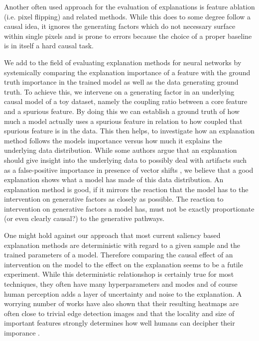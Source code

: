 Another often used approach for the evaluation of explanations is feature ablation (i.e. pixel flipping) and related methods. While this does to some degree follow a causal idea, it ignores the generating factors which do not necessary surface within single pixels and is prone to errors because the choice of a proper baseline is in itself a hard causal task. 


We add to the field of evaluating explanation methods for neural networks by systemically comparing the explanation importance of a feature with the ground truth importance in the trained model as well as the data generating ground truth. To achieve this, we intervene on a generating factor in an underlying causal model of a toy dataset, namely the coupling ratio between a core feature and a spurious feature. By doing this we can establish a ground truth of how much a model actually uses a spurious feature in relation to how coupled that spurious feature is in the data. This then helps, to investigate how an explanation method follows the models importance versus how much it explains the underlying data distribution. While some authors argue that an explanation should give insight into the underlying data  to possibly deal with artifacts such as a false-positive importance in presence of vector shifts , we believe that a good explanation shows what a model has made of this data distribution. 
An explanation method is good, if it mirrors the reaction that the model has to the intervention on generative factors as closely as possible. The reaction to intervention on generative factors a model has, must not be exactly proportionate (or even clearly causal?) to the generative pathways. 

One might hold against our approach that most current saliency based explanation methods are deterministic with regard to a given sample and the trained parameters of a model. Therefore comparing the causal effect of an intervention on the model to the effect on the explanation seems to be a futile experiment. While this deterministic relationshop is certainly true for most techniques, they often have many hyperparameters and modes and of course human perception adds a layer of uncertainty and noise to the explanation. A worrying number of works  have also shown that their resulting heatmaps are often close to trivial edge detection images  and that the locality and size of important features strongly determines how well humans can decipher their imporance . 


